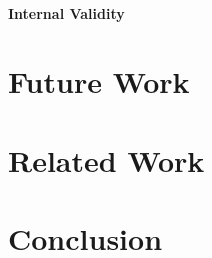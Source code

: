 \documentclass{chi2009}
\newcommand{\todo}[1]{\textsf{\textbf{\textcolor{Orange}{[[#1]]}}}}
\begin{document}
\paragraph{Internal Validity}

\section{Future Work}\label{sec:futurework}



\section{Related Work}\label{sec:relatedwork}

\section{Conclusion}\label{sec:conclusion}

\nocite{*}



\end{document}
